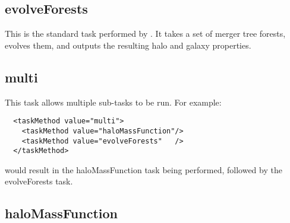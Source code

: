 \subsection{{\normalfont \ttfamily evolveForests}}

This is the standard task performed by \glc. It takes a set of merger tree forests, evolves them, and outputs the resulting halo and galaxy properties.

\subsection{{\normalfont \ttfamily multi}}

This task allows multiple sub-tasks to be run. For example:
\begin{verbatim}
  <taskMethod value="multi">
    <taskMethod value="haloMassFunction"/>
    <taskMethod value="evolveForests"   />
  </taskMethod>
\end{verbatim}
would result in the {\normalfont \ttfamily haloMassFunction} task being performed, followed by the {\normalfont \ttfamily evolveForests} task.

\subsection{{\normalfont \ttfamily haloMassFunction}}

